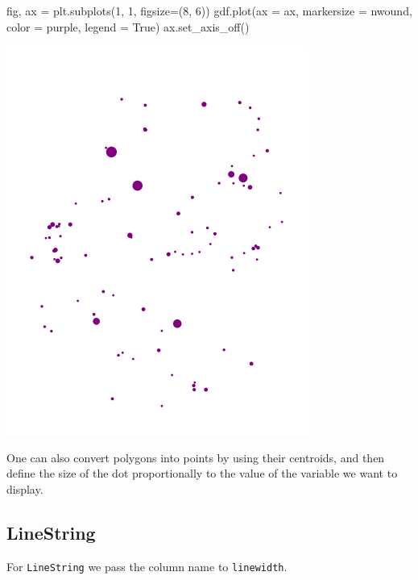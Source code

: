 \documentclass[
  letterpaper,
  DIV=11,
  numbers=noendperiod]{scrreprt}
\newenvironment{Shaded}{\begin{snugshade}}{\end{snugshade}}
\newcommand{\DecValTok}[1]{\textcolor[rgb]{0.68,0.00,0.00}{#1}}
\newcommand{\NormalTok}[1]{\textcolor[rgb]{0.00,0.23,0.31}{#1}}
\newcommand{\OperatorTok}[1]{\textcolor[rgb]{0.37,0.37,0.37}{#1}}
\newcommand{\StringTok}[1]{\textcolor[rgb]{0.13,0.47,0.30}{#1}}
\newcommand{\VariableTok}[1]{\textcolor[rgb]{0.07,0.07,0.07}{#1}}
\begin{document}
\begin{Shaded}
\begin{Highlighting}[]
\NormalTok{fig, ax }\OperatorTok{=}\NormalTok{ plt.subplots(}\DecValTok{1}\NormalTok{, }\DecValTok{1}\NormalTok{, figsize}\OperatorTok{=}\NormalTok{(}\DecValTok{8}\NormalTok{, }\DecValTok{6}\NormalTok{))}
\NormalTok{gdf.plot(ax }\OperatorTok{=}\NormalTok{ ax, markersize }\OperatorTok{=} \StringTok{\textquotesingle{}nwound\textquotesingle{}}\NormalTok{, color }\OperatorTok{=} \StringTok{\textquotesingle{}purple\textquotesingle{}}\NormalTok{, legend }\OperatorTok{=} \VariableTok{True}\NormalTok{)}
\NormalTok{ax.set\_axis\_off()}
\end{Highlighting}
\end{Shaded}

\includegraphics{labs/w02_maps_files/figure-pdf/cell-51-output-1.png}

One can also convert polygons into points by using their centroids, and
then define the size of the dot proportionally to the value of the
variable we want to display.

\subsection{LineString}\label{linestring}

For \texttt{LineString} we pass the column name to \texttt{linewidth}.
\end{document}
